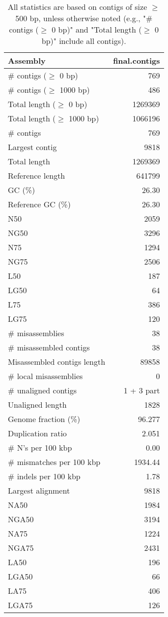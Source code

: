 \documentclass[12pt,a4paper]{article}
\begin{document}
\begin{table}[ht]
\begin{center}
\caption{All statistics are based on contigs of size $\geq$ 500 bp, unless otherwise noted (e.g., "\# contigs ($\geq$ 0 bp)" and "Total length ($\geq$ 0 bp)" include all contigs).}
\begin{tabular}{|l*{1}{|r}|}
\hline
Assembly & final.contigs \\ \hline
\# contigs ($\geq$ 0 bp) & 769 \\ \hline
\# contigs ($\geq$ 1000 bp) & 486 \\ \hline
Total length ($\geq$ 0 bp) & 1269369 \\ \hline
Total length ($\geq$ 1000 bp) & 1066196 \\ \hline
\# contigs & 769 \\ \hline
Largest contig & 9818 \\ \hline
Total length & 1269369 \\ \hline
Reference length & 641799 \\ \hline
GC (\%) & 26.30 \\ \hline
Reference GC (\%) & 26.30 \\ \hline
N50 & 2059 \\ \hline
NG50 & 3296 \\ \hline
N75 & 1294 \\ \hline
NG75 & 2506 \\ \hline
L50 & 187 \\ \hline
LG50 & 64 \\ \hline
L75 & 386 \\ \hline
LG75 & 120 \\ \hline
\# misassemblies & 38 \\ \hline
\# misassembled contigs & 38 \\ \hline
Misassembled contigs length & 89858 \\ \hline
\# local misassemblies & 0 \\ \hline
\# unaligned contigs & 1 + 3 part \\ \hline
Unaligned length & 1828 \\ \hline
Genome fraction (\%) & 96.277 \\ \hline
Duplication ratio & 2.051 \\ \hline
\# N's per 100 kbp & 0.00 \\ \hline
\# mismatches per 100 kbp & 1934.44 \\ \hline
\# indels per 100 kbp & 1.78 \\ \hline
Largest alignment & 9818 \\ \hline
NA50 & 1984 \\ \hline
NGA50 & 3194 \\ \hline
NA75 & 1224 \\ \hline
NGA75 & 2431 \\ \hline
LA50 & 196 \\ \hline
LGA50 & 66 \\ \hline
LA75 & 406 \\ \hline
LGA75 & 126 \\ \hline
\end{tabular}
\end{center}
\end{table}
\end{document}
